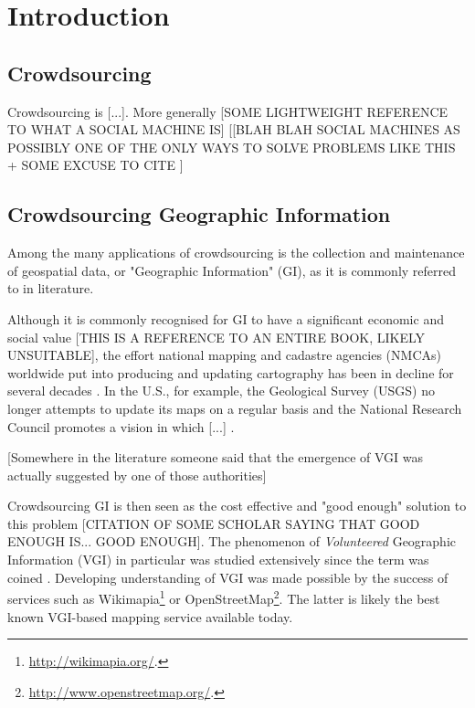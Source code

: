 \section{Introduction}

\subsection{Crowdsourcing}

    Crowdsourcing is {[}...{]}. More generally {[}SOME LIGHTWEIGHT REFERENCE TO WHAT A SOCIAL MACHINE IS{]} [{[}BLAH BLAH SOCIAL MACHINES AS POSSIBLY ONE OF THE ONLY WAYS TO SOLVE PROBLEMS LIKE THIS + SOME EXCUSE TO CITE \cite{OReilly:2015uo}{]}

\subsection{Crowdsourcing Geographic Information}

    Among the many applications of crowdsourcing is the collection and maintenance of geospatial data, or "Geographic Information" (GI), as it is commonly referred to in literature.
    
    Although it is commonly recognised for GI to have a significant economic and social value \cite{Sui:2012uf}[THIS IS A REFERENCE TO AN ENTIRE BOOK, LIKELY UNSUITABLE], the effort national mapping and cadastre agencies (NMCAs) worldwide put into producing and updating cartography has been in decline for several decades \cite{ESTES:1994vz}. In the U.S., for example, the Geological Survey (USGS) no longer attempts to update its maps on a regular basis and the National Research Council promotes a vision in which {[}...{]} \cite{Committee:1993vp}.
    
    {[}Somewhere in the literature someone said that the emergence of VGI was actually suggested by one of those authorities{]}
    
    Crowdsourcing GI is then seen as the cost effective and "good enough" solution to this problem [CITATION OF SOME SCHOLAR SAYING THAT GOOD ENOUGH IS... GOOD ENOUGH]. The phenomenon of {\it Volunteered} Geographic Information (VGI) in particular was studied extensively since the term was coined \cite{Goodchild:2007vt}. Developing understanding of VGI was made possible by the success of services such as Wikimapia\footnote{\url{http://wikimapia.org/}.} or OpenStreetMap\footnote{\url{http://www.openstreetmap.org/}.}. The latter is likely the best known VGI-based mapping service available today.

